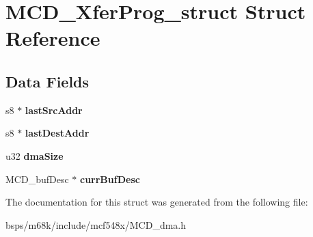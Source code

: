 \hypertarget{structMCD__XferProg__struct}{}\section{M\+C\+D\+\_\+\+Xfer\+Prog\+\_\+struct Struct Reference}
\label{structMCD__XferProg__struct}
\subsection*{Data Fields}
\begin{DoxyCompactItemize}
\item 
\mbox{\label{structMCD__XferProg__struct_a541cff6e8b48af54dff96dc19ea5283f}} 
s8 $\ast$ {\bfseries last\+Src\+Addr}
\item 
\mbox{\label{structMCD__XferProg__struct_a9a8db9be139ceb75287afee3f50334b6}} 
s8 $\ast$ {\bfseries last\+Dest\+Addr}
\item 
\mbox{\label{structMCD__XferProg__struct_ac1d556634023526c0a22075d9f6f95b8}} 
u32 {\bfseries dma\+Size}
\item 
\mbox{\label{structMCD__XferProg__struct_a43ff3a181040c7e9511e76e730f5fed3}} 
M\+C\+D\+\_\+buf\+Desc $\ast$ {\bfseries curr\+Buf\+Desc}
\end{DoxyCompactItemize}


The documentation for this struct was generated from the following file\+:\begin{DoxyCompactItemize}
\item 
bsps/m68k/include/mcf548x/M\+C\+D\+\_\+dma.\+h\end{DoxyCompactItemize}
